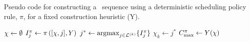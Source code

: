 \begin{algorithm}[t]
    \caption{Pseudo code for constructing a \JSP\ sequence using a 
    deterministic scheduling policy 
    rule, $\pi$, for a fixed construction heuristic (Y).} 
    \label{pseudo:constructJSP}
    \begin{algorithmic}[1]
        \State ${\mathbf{\chi}} \gets \emptyset$  
        \State $I_j^{\pi} \leftarrow \pi \left([{\mathbf{\chi}},j],Y\right)$ 
        \EndFor
        \State $j^* \gets \mathop{\rm argmax}_{j\in \mathcal{L}^{(k)}}\{I_j^{\pi}\}$ 
        \State $\chi_k \gets j^*$ 
        \EndFor
        \State \Return $C_{\max}^{\pi} \gets Y({\mathbf{\chi}})$ 
        \EndProcedure
    \end{algorithmic}
\end{algorithm}